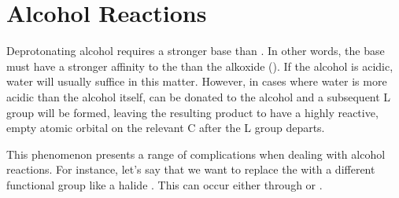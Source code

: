 \documentclass[10pt]{article}
\begin{document}
\section{Alcohol Reactions}

  Deprotonating alcohol requires a stronger base than . In other words, the base must have a stronger affinity to the  than the alkoxide (). If the alcohol is acidic, water will usually suffice in this matter. However, in cases where water is more acidic than the alcohol itself,  can be donated to the alcohol and a subsequent  L group will be formed, leaving the resulting product to have a highly reactive, empty atomic orbital on the relevant C after the  L group departs.


  This phenomenon presents a range of complications when dealing with alcohol reactions. For instance, let's say that we want to replace the  with a different functional group like a halide . This can occur either through \snt or \sno.

\end{document}
